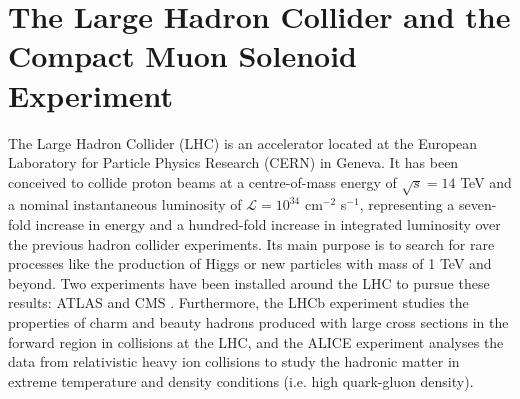 \chapter[LHC and CMS detector]{The Large Hadron Collider and the Compact Muon Solenoid Experiment}

The Large Hadron Collider (LHC) \cite{LHC} is an accelerator located at the European Laboratory for Particle Physics Research (CERN) in Geneva. It has been conceived to collide proton beams at a centre-of-mass energy of $\sqrt{s} = 14$ TeV and
a nominal instantaneous luminosity of $\mathcal{L} = 10^{34}$ cm$^{-2}$ s$^{-1}$, representing a seven-fold increase in energy and a hundred-fold increase in integrated luminosity over the previous hadron collider experiments. Its main purpose is to search for rare processes like the production of Higgs or new particles with mass of 1 TeV and beyond. Two experiments have been installed around the LHC to pursue these results: ATLAS \cite{ATL} and CMS \cite{CMS}. Furthermore, the LHCb \cite{LHbr} experiment studies the properties of charm and beauty hadrons produced with large cross sections in the forward region in collisions at the LHC, and the ALICE \cite{ALI} experiment analyses the data from relativistic heavy ion collisions to study the hadronic matter in extreme temperature and density conditions (i.e. high quark-gluon density).

